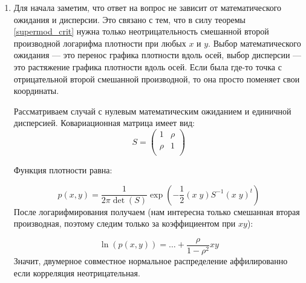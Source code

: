 \begin{enumerate}
\begin{enumerate}
\end{enumerate}

\item Для начала заметим, что ответ на вопрос не зависит от математического ожидания и дисперсии. Это связано с тем, что в силу теоремы \ref{supermod_crit} нужна только неотрицательность смешанной второй производной логарифма плотности при любых $ x $ и $ y $. Выбор математического ожидания — это перенос графика плотности вдоль осей, выбор дисперсии — это растяжение графика плотности вдоль осей. Если была где-то точка с отрицательной второй смешанной производной, то она просто поменяет свои координаты.

Рассматриваем случай с нулевым математическим ожиданием и единичной дисперсией. Ковариационная матрица имеет вид:
\begin{equation}
S=\left(\begin{array}{cc}
1 & \rho \\
\rho & 1 \\
\end{array}
\right)
\end{equation}

Функция плотности равна:

\begin{equation}
p(x,y)=\frac{1}{2\pi \det(S)} \exp\left(-\frac{1}{2}(x\; y)S^{-1}(x\; y)^{t}\right)
\end{equation}
После логарифмирования получаем (нам интересна только смешанная вторая производная, поэтому следим только за коэффициентом при $ xy $):

\begin{equation}
\ln (p(x,y))=\ldots+\frac{\rho}{1-\rho^{2}}xy
\end{equation}
Значит, двумерное совместное нормальное распределение аффилированно если корреляция неотрицательная.


\end{enumerate}
